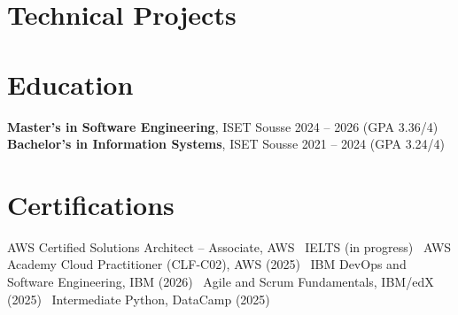 \documentclass[a4paper,10pt]{article}
\begin{document}
\section*{Technical Projects}
\pAIS
\pEmotion
\pFlaskAPI

\section*{Education}
\textbf{Master's in Software Engineering}, ISET Sousse \hfill 2024 -- 2026 (GPA 3.36/4)\\
\textbf{Bachelor's in Information Systems}, ISET Sousse \hfill 2021 -- 2024 (GPA 3.24/4)

\section*{Certifications}
AWS Certified Solutions Architect -- Associate, AWS \textbar\ IELTS (in progress) \textbar\ AWS Academy Cloud Practitioner (CLF-C02), AWS (2025) \textbar\ IBM DevOps and Software Engineering, IBM (2026) \textbar\ Agile and Scrum Fundamentals, IBM/edX (2025) \textbar\ Intermediate Python, DataCamp (2025)
\end{document}
